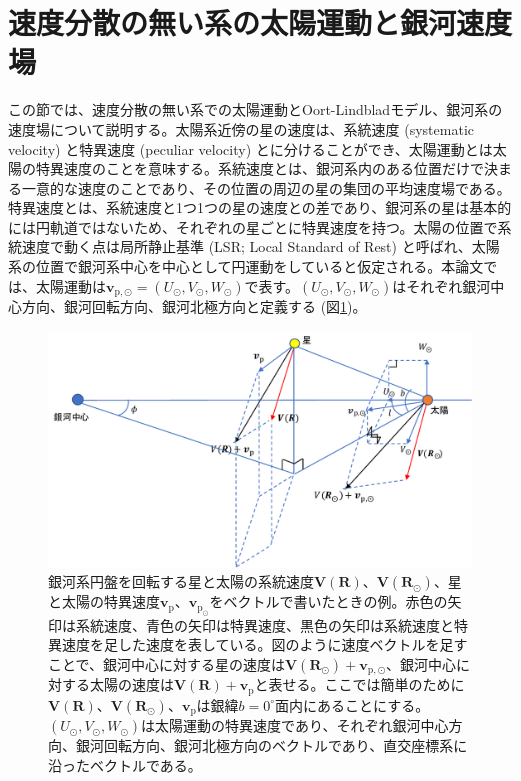 \section{速度分散の無い系の太陽運動と銀河速度場} %
この節では、速度分散の無い系での太陽運動とOort-Lindbladモデル、銀河系の速度場について説明する。太陽系近傍の星の速度は、系統速度 (systematic velocity) と特異速度 (peculiar velocity) とに分けることができ、太陽運動とは太陽の特異速度のことを意味する。系統速度とは、銀河系内のある位置だけで決まる一意的な速度のことであり、その位置の周辺の星の集団の平均速度場である。特異速度とは、系統速度と1つ1つの星の速度との差であり、銀河系の星は基本的には円軌道ではないため、それぞれの星ごとに特異速度を持つ。太陽の位置で系統速度で動く点は局所静止基準 (LSR; Local Standard of Rest) と呼ばれ、太陽系の位置で銀河系中心を中心として円運動をしていると仮定される。本論文では、太陽運動は$\pmb{v}_{\mathrm{p},\odot} = (U_{\odot},V_{\odot},W_{\odot})$で表す。$(U_{\odot},V_{\odot},W_{\odot})$はそれぞれ銀河中心方向、銀河回転方向、銀河北極方向と定義する (図\ref{fig:SolarMotion})。
\begin{figure}[htbp]
\begin{center}
	\includegraphics[width=14cm]{fig/SolarMotion.pdf}
	\caption{銀河系円盤を回転する星と太陽の系統速度$\pmb{V}(\pmb{R})、\pmb{V}(\pmb{R_{\odot}})$、星と太陽の特異速度$\pmb{v}_{\mathrm{p}}、\pmb{v}_{\mathrm{p}_\odot}$をベクトルで書いたときの例。赤色の矢印は系統速度、青色の矢印は特異速度、黒色の矢印は系統速度と特異速度を足した速度を表している。図のように速度ベクトルを足すことで、銀河中心に対する星の速度は$\pmb{V}(\pmb{R}_{\odot}) + \pmb{v}_{\mathrm{p},\odot}$、銀河中心に対する太陽の速度は$\pmb{V}(\pmb{R}) + \pmb{v}_{\mathrm{p}}$と表せる。ここでは簡単のために$\pmb{V}(\pmb{R})、\pmb{V}(\pmb{R}_{\odot})、\pmb{v}_{\mathrm{p}}$は銀緯$b=0^{\circ}$面内にあることにする。$(U_{\odot},V_{\odot},W_{\odot})$は太陽運動の特異速度であり、それぞれ銀河中心方向、銀河回転方向、銀河北極方向のベクトルであり、直交座標系に沿ったベクトルである。}
	\label{fig:SolarMotion}
\end{center}
\end{figure}

